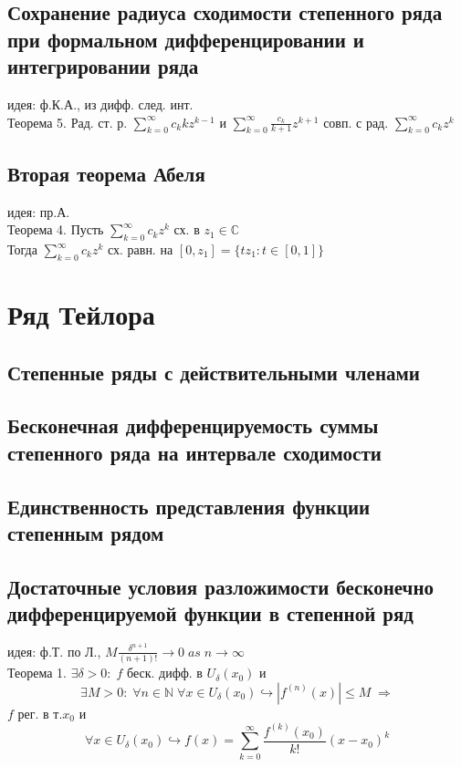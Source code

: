 \documentclass{article}
\begin{document}
\subsection{Сохранение радиуса сходимости степенного ряда при формальном дифференцировании и интегрировании ряда}
идея: ф.К.А., из дифф. след. инт. \\
Теорема 5. Рад. ст. р. $\sum_{k=0}^\infty c_k k z^{k-1}$ и $\sum_{k=0}^\infty \frac{c_k}{k+1} z^{k+1}$ совп. с рад. $\sum_{k=0}^\infty c_k z^k$
\subsection{Вторая теорема Абеля}
идея: пр.А. \\
Теорема 4. Пусть $\sum_{k=0}^\infty c_k z^k$ сх. в $z_1 \in \mathbb C$ \\
Тогда $\sum_{k=0}^\infty c_k z^k$ сх. равн. на $[0, z_1] = \{ tz_1: t \in [0,1] \}$


\newpage
\section{Ряд Тейлора}
\subsection{Степенные ряды с действительными членами}
\subsection{Бесконечная дифференцируемость суммы степенного ряда на интервале сходимости}
\subsection{Единственность представления функции степенным рядом}
\subsection{Достаточные условия разложимости бесконечно дифференцируемой функции в степенной ряд}
идея: ф.Т. по Л., $M \frac{\delta^{n+1}}{(n+1)!} \rightarrow 0 \; as \; n \rightarrow \infty$ \\
Теорема 1. $\exists \delta > 0: \; f$ беск. дифф. в $U_\delta (x_0)$ и 
\begin{equation*}
    \exists M > 0: \; \forall n \in \mathbb N \; \forall x \in U_\delta (x_0) \hookrightarrow |f^{(n)}(x)| \leq M \; \Rightarrow
\end{equation*}
$f$ рег. в т.$x_0$ и
\begin{equation*}
    \forall x \in U_\delta (x_0) \hookrightarrow f(x) = \sum_{k=0}^\infty \frac{f^{(k)} (x_0)}{k!} (x-x_0)^k
\end{equation*}
\end{document}
